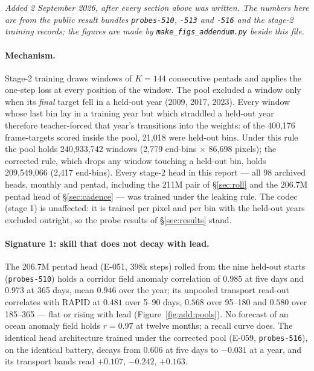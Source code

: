\documentclass[10pt]{article}
\begin{document}
\emph{Added 2 September 2026, after every section above was written. The
numbers here are from the public result bundles \texttt{probes-510}, \texttt{-513}
and \texttt{-516} and the stage-2 training records; the figures are made by
\texttt{make\_figs\_addendum.py} beside this file.}

\paragraph{Mechanism.} Stage-2 training draws windows of $K=144$ consecutive
pentads and applies the one-step loss at every position of the window. The
pool excluded a window only when its \emph{final} target fell in a held-out
year (2009, 2017, 2023). Every window whose last bin lay in a training year
but which straddled a held-out year therefore teacher-forced that year's
transitions into the weights: of the 400{,}176 frame-targets scored inside
the pool, 21{,}018 were held-out bins. Under this rule the pool holds
240{,}933{,}742 windows (2{,}779 end-bins $\times$ 86{,}698 pixels); the
corrected rule, which drops any window touching a held-out bin, holds
209{,}549{,}066 (2{,}417 end-bins). Every stage-2 head in this report ---
all 98 archived heads, monthly and pentad, including the 211M pair of
\S\ref{sec:roll} and the 206.7M pentad head of \S\ref{sec:cadence} --- was
trained under the leaking rule. The codec (stage 1) is unaffected: it is
trained per pixel and per bin with the held-out years excluded outright,
so the probe results of \S\ref{sec:results} stand.

\paragraph{Signature 1: skill that does not decay with lead.} The 206.7M
pentad head (E-051, 398k steps) rolled from the nine held-out starts
(\texttt{probes-510}) holds a corridor field anomaly correlation of $0.985$
at five days and $0.973$ at 365 days, mean $0.946$ over the year; its
unpooled transport read-out correlates with RAPID at $0.481$ over 5--90
days, $0.568$ over 95--180 and $0.580$ over 185--365 --- flat or rising with
lead (Figure~\ref{fig:add:pools}). No forecast of an ocean anomaly field
holds $r=0.97$ at twelve months; a recall curve does. The identical head
architecture trained under the corrected pool (E-059, \texttt{probes-516}),
on the identical battery, decays from $0.606$ at five days to $-0.031$ at a
year, and its transport bands read $+0.107$, $-0.242$, $+0.163$.
\end{document}
